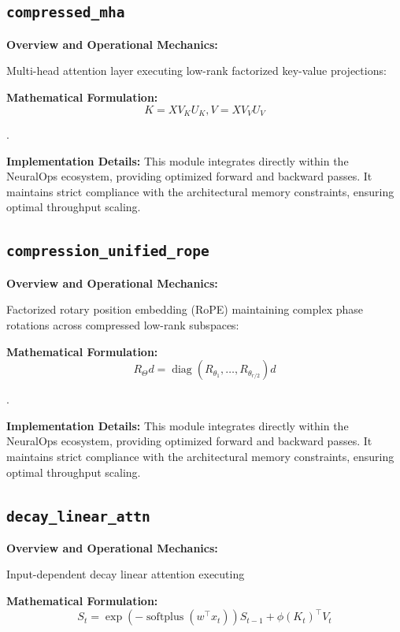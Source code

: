 \documentclass[10pt,twocolumn,letterpaper]{article}
\begin{document}
\subsection{\texttt{compressed\_mha}}
\textbf{Overview and Operational Mechanics:}

Multi-head attention layer executing low-rank factorized key-value projections:

\textbf{Mathematical Formulation:}
\begin{equation}
K = X V_K U_K, V = X V_V U_V
\end{equation}

.

\textbf{Implementation Details:}
This module integrates directly within the NeuralOps ecosystem, providing optimized forward and backward passes. It maintains strict compliance with the architectural memory constraints, ensuring optimal throughput scaling.

\subsection{\texttt{compression\_unified\_rope}}
\textbf{Overview and Operational Mechanics:}

Factorized rotary position embedding (RoPE) maintaining complex phase rotations across compressed low-rank subspaces:

\textbf{Mathematical Formulation:}
\begin{equation}
R_\Theta d = \operatorname{diag}(R_{\theta_1}, \dots, R_{\theta_{r/2}}) d
\end{equation}

.

\textbf{Implementation Details:}
This module integrates directly within the NeuralOps ecosystem, providing optimized forward and backward passes. It maintains strict compliance with the architectural memory constraints, ensuring optimal throughput scaling.

\subsection{\texttt{decay\_linear\_attn}}
\textbf{Overview and Operational Mechanics:}

Input-dependent decay linear attention executing

\textbf{Mathematical Formulation:}
\begin{equation}
S_t = \exp(-\operatorname{softplus}(w^\top x_t)) S_{t-1} + \phi(K_t)^\top V_t
\end{equation}
\end{document}
